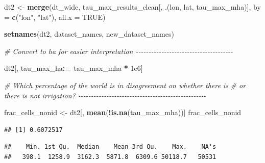 \documentclass[
  11pt,
]{article}
\newenvironment{Shaded}{\begin{snugshade}}{\end{snugshade}}
\newcommand{\AttributeTok}[1]{\textcolor[rgb]{0.13,0.29,0.53}{#1}}
\newcommand{\CommentTok}[1]{\textcolor[rgb]{0.56,0.35,0.01}{\textit{#1}}}
\newcommand{\ConstantTok}[1]{\textcolor[rgb]{0.56,0.35,0.01}{#1}}
\newcommand{\FloatTok}[1]{\textcolor[rgb]{0.00,0.00,0.81}{#1}}
\newcommand{\FunctionTok}[1]{\textcolor[rgb]{0.13,0.29,0.53}{\textbf{#1}}}
\newcommand{\NormalTok}[1]{#1}
\newcommand{\OtherTok}[1]{\textcolor[rgb]{0.56,0.35,0.01}{#1}}
\newcommand{\SpecialCharTok}[1]{\textcolor[rgb]{0.81,0.36,0.00}{\textbf{#1}}}
\newcommand{\StringTok}[1]{\textcolor[rgb]{0.31,0.60,0.02}{#1}}
\begin{document}
\begin{Shaded}
\begin{Highlighting}[]
\NormalTok{dt2 }\OtherTok{\textless{}{-}} \FunctionTok{merge}\NormalTok{(dt\_wide, tau\_max\_results\_clean[, .(lon, lat, tau\_max\_mha)],}
             \AttributeTok{by =} \FunctionTok{c}\NormalTok{(}\StringTok{"lon"}\NormalTok{, }\StringTok{"lat"}\NormalTok{), }\AttributeTok{all.x =} \ConstantTok{TRUE}\NormalTok{)}

\FunctionTok{setnames}\NormalTok{(dt2, dataset\_names, new\_dataset\_names)}

\CommentTok{\# Convert to ha for easier interpretation {-}{-}{-}{-}{-}{-}{-}{-}{-}{-}{-}{-}{-}{-}{-}{-}{-}{-}{-}{-}{-}{-}{-}{-}{-}{-}{-}{-}{-}{-}{-}{-}{-}{-}{-}{-}{-}{-}}

\NormalTok{dt2[, tau\_max\_ha}\SpecialCharTok{:=}\NormalTok{ tau\_max\_mha }\SpecialCharTok{*} \FloatTok{1e6}\NormalTok{]}

\CommentTok{\# Which percentage of the world is in disagreement on whether there is}
\CommentTok{\# or there is not irrigation? {-}{-}{-}{-}{-}{-}{-}{-}{-}{-}{-}{-}{-}{-}{-}{-}{-}{-}{-}{-}{-}{-}{-}{-}{-}{-}{-}{-}{-}{-}{-}{-}{-}{-}{-}{-}{-}{-}{-}{-}{-}{-}{-}{-}{-}{-}{-}{-}{-}{-}}

\NormalTok{frac\_cells\_nonid }\OtherTok{\textless{}{-}}\NormalTok{ dt2[, }\FunctionTok{mean}\NormalTok{(}\SpecialCharTok{!}\FunctionTok{is.na}\NormalTok{(tau\_max\_mha))]}
\NormalTok{frac\_cells\_nonid}
\end{Highlighting}
\end{Shaded}

\begin{verbatim}
## [1] 0.6072517
\end{verbatim}

\begin{Shaded}
\end{Shaded}

\begin{verbatim}
##    Min. 1st Qu.  Median    Mean 3rd Qu.    Max.    NA's 
##   398.1  1258.9  3162.3  5871.8  6309.6 50118.7   50531
\end{verbatim}
\end{document}
